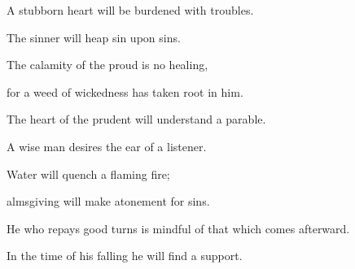 {\par }{\Q {}A stubborn heart will be burdened with troubles.
\par }{\QB The sinner will heap sin upon sins.
\par }{\Q {}The calamity of the proud is no healing,
\par }{\QB for a weed of wickedness has taken root in him.
\par }{\Q {}The heart of the prudent will understand a parable.
\par }{\QB A wise man desires the ear of a listener.
\par }{\Q {}Water will quench a flaming fire;
\par }{\QB almsgiving will make atonement for sins.
\par }{\Q {}He who repays good turns is mindful of that which comes afterward.
\par }{\QB In the time of his falling he will find a support.
\par }{\BB \par }
